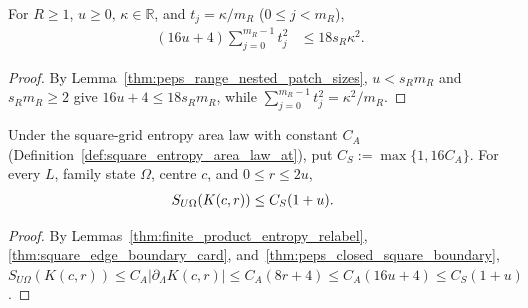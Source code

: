 \begin{lemma}
    \label{thm:peps_range_nested_patch_quadratic_sum}
    \leanok
    For $R\ge1$, $u\ge0$, $\kappa\in\mathbb R$, and $t_j=\kappa/m_R$ ($0\le j<m_R$),
    \begin{align}
        (16u+4)\sum_{j=0}^{m_R-1}t_j^2 & \le18s_R\kappa^2.
        \label{eq:peps_range_nested_patch_budget}
    \end{align}
\end{lemma}
\begin{proof}\leanok
    By Lemma~\ref{thm:peps_range_nested_patch_sizes}, $u<s_Rm_R$ and $s_Rm_R\ge2$ give $16u+4\le 18s_Rm_R$, while $\sum_{j=0}^{m_R-1}t_j^2=\kappa^2/m_R$.
\end{proof}

\begin{lemma}
    \label{lem:peps_closed_square_entropy_explicit}
    \leanok
    Under the square-grid entropy area law with constant $C_A$ (Definition~\ref{def:square_entropy_area_law_at}), put $C_S:=\max\{1,16C_A\}$. For every $L$, family state $\Omega$, centre $c$, and $0\le r\le2u$,
    \begin{align}
        S_{U\Omega}(K(c,r)) & \le C_S(1+u). \notag
    \end{align}
\end{lemma}
\begin{proof}
    \leanok
    By Lemmas~\ref{thm:finite_product_entropy_relabel}, \ref{thm:square_edge_boundary_card}, and~\ref{thm:peps_closed_square_boundary}, $S_{U\Omega}(K(c,r))\le C_A|\partial_\Lambda K(c,r)|\le C_A(8r+4)\le C_A(16u+4)\le C_S(1+u)$.
\end{proof}

